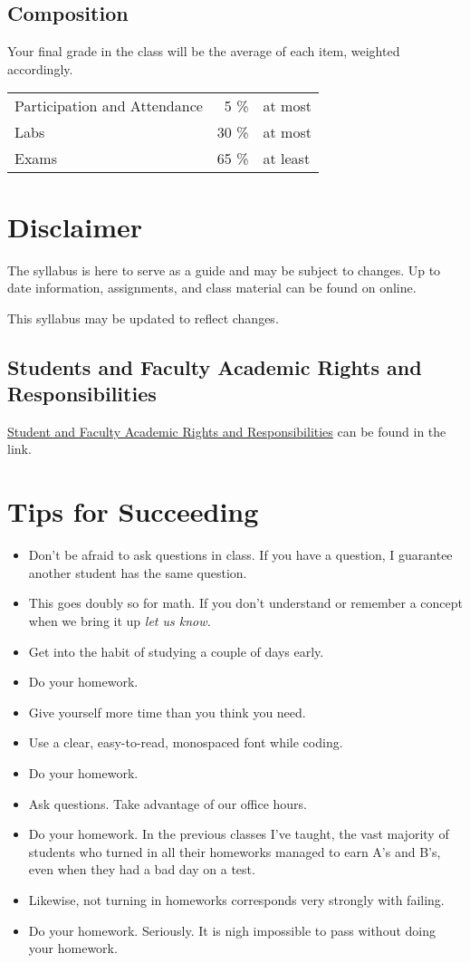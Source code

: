 \documentclass[10pt, letter]{article}
\begin{document}
\subsection*{Composition}
Your final grade in the class will be the average of each item, weighted accordingly.

\begin{tabular}{ l  r l}
	Participation and Attendance & 5 \% & at most \\
	Labs & 30 \% & at most \\
	Exams & 65 \% & at least \\
\end{tabular}

\section{Disclaimer}
The syllabus is here to serve as a guide and may be subject to changes.  Up to date information, assignments, and class material can be found on online.

This syllabus may be updated to reflect changes.


\subsection*{Students and Faculty Academic Rights and Responsibilities}
\href{http://policies.temple.edu/PDF/99.pdf}{Student and Faculty Academic Rights and Responsibilities} can be found in the link.


\section{Tips for Succeeding}
\begin{itemize}
	\item Don't be afraid to ask questions in class.  If you have a question, I guarantee another student has the same question.  
	\item This goes doubly so for math.  If you don't understand or remember a concept when we bring it up \emph{let us know.}
	\item Get into the habit of studying a couple of days early.
	\item Do your homework.
	\item Give yourself more time than you think you need.
	\item Use a clear, easy-to-read, monospaced font while coding.
	\item Do your homework.
	\item Ask questions.  Take advantage of our office hours.
	\item Do your homework.  In the previous classes I've taught, the vast majority of students who turned in all their homeworks managed to earn A's and B's, even when they had a bad day on a test.
	\item Likewise, not turning in homeworks corresponds very strongly with failing.
	\item Do your homework. Seriously.  It is nigh impossible to pass without doing your homework.
	
	
\end{itemize}
\end{document}
